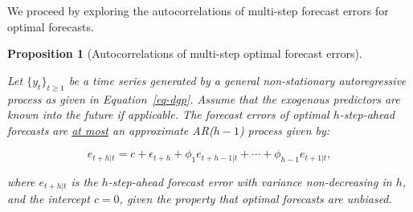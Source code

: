 \documentclass[
  11pt,
  a4paper,
]{article}
\theoremstyle{plain}
\theoremstyle{plain}
\newtheorem{proposition}{Proposition}[section]
\theoremstyle{remark}
\begin{document}
We proceed by exploring the autocorrelations of multi-step forecast
errors for optimal forecasts.

\begin{proposition}[Autocorrelations of multi-step optimal forecast
errors]\protect\hypertarget{prp-ar}{}\label{prp-ar}

Let \(\{y_t\}_{t \geq 1}\) be a time series generated by a general
non-stationary autoregressive process as given in Equation~\ref{eq-dgp}.
Assume that the exogenous predictors are known into the future if
applicable. The forecast errors of optimal \(h\)-step-ahead forecasts
are \ul{at most} an approximate AR(\(h-1\)) process given by:

\[
e_{t+h|t} = c + \epsilon_{t+h} + \phi_1e_{t+h-1|t} + \cdots + \phi_{h-1}e_{t+1|t},
\]

where \(e_{t+h|t}\) is the \(h\)-step-ahead forecast error with variance
non-decreasing in \(h\), and the intercept \(c=0\), given the property
that optimal forecasts are unbiased.

\end{proposition}
\end{document}
